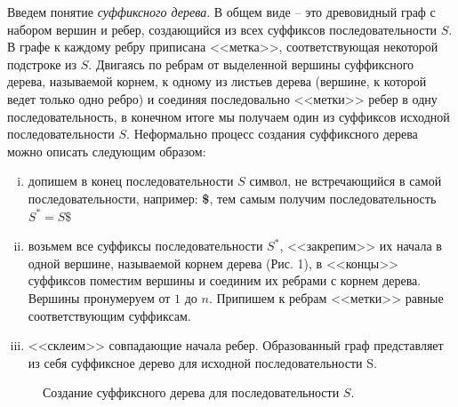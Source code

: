 \documentclass[letterpaper, 11pt]{article}
\begin{document}
Введем понятие \textit{суффиксного дерева}. В общем виде -- это древовидный граф с набором вершин и ребер, создающийся из всех суффиксов последовательности $S$. В графе к каждому ребру приписана <<метка>>, соответствующая некоторой подстроке из $S$. Двигаясь по ребрам от выделенной вершины суффиксного дерева, называемой корнем, к одному из листьев дерева (вершине, к которой ведет только одно ребро) и соединяя последовально <<метки>> ребер в одну последовательность, в конечном итоге мы получаем один из суффиксов исходной последовательности $S$. Неформально процесс создания суффиксного дерева можно описать следующим образом:
\begin{enumerate}[(i)]
\item
допишем в конец последовательности $S$ символ, не встречающийся в самой последовательности, например: \textbf{\$}, тем самым получим последовательность $S^{*} = S\$$
\item
возьмем все суффиксы последовательности $S^{*}$, <<закрепим>> их начала в одной вершине, называемой корнем дерева (Рис. 1), в <<концы>> суффиксов поместим вершины и соединим их ребрами с корнем дерева. Вершины пронумеруем от $1$ до $n$. Припишем к ребрам <<метки>> равные соответствующим суффиксам.
\item
<<склеим>> совпадающие начала ребер. Образованный граф представляет из себя суффиксное дерево для исходной последовательности S.
\end{enumerate}

\begin{figure}[H]
  \caption{Создание суффиксного дерева для последовательности $S$.}
\end{figure}
\end{document}

